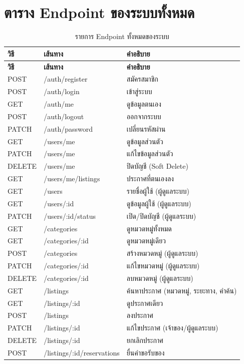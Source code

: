 \documentclass[12pt,a4paper]{report}
\begin{document}
\chapter{ตาราง Endpoint ของระบบทั้งหมด}

\begin{longtable}{l l p{6.2cm}}
\caption{รายการ Endpoint ทั้งหมดของระบบ}\\
\toprule
\textbf{วิธี} & \textbf{เส้นทาง} & \textbf{คำอธิบาย}\\
\midrule
\endfirsthead
\toprule
\textbf{วิธี} & \textbf{เส้นทาง} & \textbf{คำอธิบาย}\\
\midrule
\endhead
\bottomrule
\endfoot
POST & /auth/register & สมัครสมาชิก\\
POST & /auth/login & เข้าสู่ระบบ\\
GET & /auth/me & ดูข้อมูลตนเอง\\
POST & /auth/logout & ออกจากระบบ\\
PATCH & /auth/password & เปลี่ยนรหัสผ่าน\\
GET & /users/me & ดูข้อมูลส่วนตัว\\
PATCH & /users/me & แก้ไขข้อมูลส่วนตัว\\
DELETE & /users/me & ปิดบัญชี (Soft Delete)\\
GET & /users/me/listings & ประกาศที่ตนเองลง\\
GET & /users & รายชื่อผู้ใช้ (ผู้ดูแลระบบ)\\
GET & /users/:id & ดูข้อมูลผู้ใช้ (ผู้ดูแลระบบ)\\
PATCH & /users/:id/status & เปิด/ปิดบัญชี (ผู้ดูแลระบบ)\\
GET & /categories & ดูหมวดหมู่ทั้งหมด\\
GET & /categories/:id & ดูหมวดหมู่เดียว\\
POST & /categories & สร้างหมวดหมู่ (ผู้ดูแลระบบ)\\
PATCH & /categories/:id & แก้ไขหมวดหมู่ (ผู้ดูแลระบบ)\\
DELETE & /categories/:id & ลบหมวดหมู่ (ผู้ดูแลระบบ)\\
GET & /listings & ค้นหาประกาศ (หมวดหมู่, ระยะทาง, คำค้น)\\
GET & /listings/:id & ดูประกาศเดียว\\
POST & /listings & ลงประกาศ\\
PATCH & /listings/:id & แก้ไขประกาศ (เจ้าของ/ผู้ดูแลระบบ)\\
DELETE & /listings/:id & ยกเลิกประกาศ\\
POST & /listings/:id/reservations & ยื่นคำขอรับของ\\

\end{longtable}
\end{document}

